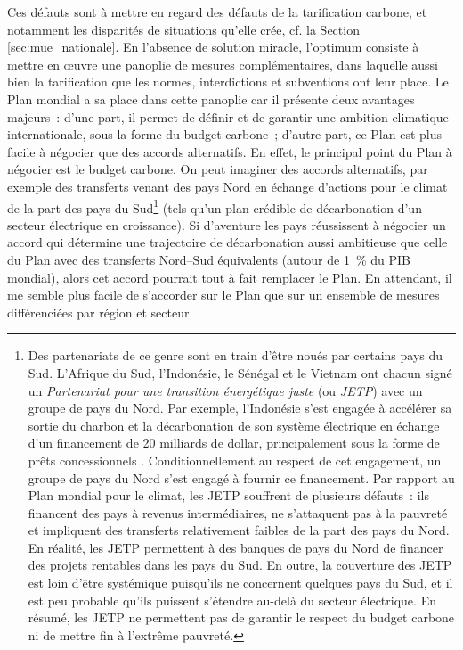 \documentclass[a5paper,french,openany]{memoir}
\begin{document}
Ces défauts sont à mettre en regard des défauts de la tarification carbone, et notamment les disparités de situations qu'elle crée, cf. la Section \ref{sec:mue_nationale}. En l'absence de solution miracle, l'optimum consiste à mettre en œuvre une panoplie de mesures complémentaires, dans laquelle aussi bien la tarification que les normes, interdictions et subventions ont leur place. Le Plan mondial a sa place dans cette panoplie car il présente deux avantages majeurs~: d'une part, il permet de définir et de garantir une ambition climatique internationale, sous la forme du budget carbone~; d'autre part, ce Plan est plus facile à négocier que des accords alternatifs. En effet, le principal point du Plan à négocier est le budget carbone. On peut imaginer des accords alternatifs, par exemple des transferts venant des pays Nord en échange d'actions pour le climat de la part des pays du Sud\footnote{Des partenariats de ce genre sont en train d'être noués par certains pays du Sud. L'Afrique du Sud, l'Indonésie, le Sénégal et le Vietnam ont chacun signé un \textit{Partenariat pour une transition énergétique juste} (ou \textit{JETP}) avec un groupe de pays du Nord. Par exemple, l'Indonésie s'est engagée à accélérer sa sortie du charbon et la décarbonation de son système électrique en échange d'un financement de 20 milliards de dollar, principalement sous la forme de prêts concessionnels \citep{ha-duong_just_2023}. Conditionnellement au respect de cet engagement, un groupe de pays du Nord s'est engagé à fournir ce financement. Par rapport au Plan mondial pour le climat, les JETP souffrent de plusieurs défauts~: ils financent des pays à revenus intermédiaires, ne s'attaquent pas à la pauvreté et impliquent des transferts relativement faibles de la part des pays du Nord. En réalité, les JETP permettent à des banques de pays du Nord de financer des projets rentables dans les pays du Sud. En outre, la couverture des JETP est loin d'être systémique puisqu'ils ne concernent quelques pays du Sud, et il est peu probable qu'ils puissent s'étendre au-delà du secteur électrique. En résumé, les JETP ne permettent pas de garantir le respect du budget carbone ni de mettre fin à l'extrême pauvreté.} 
(tels qu'un plan crédible de décarbonation d'un secteur électrique en croissance). Si d'aventure les pays réussissent à négocier un accord qui détermine une trajectoire de décarbonation aussi ambitieuse que celle du Plan avec des transferts Nord--Sud équivalents (autour de 1~\% du PIB mondial), alors cet accord pourrait tout à fait remplacer le Plan. En attendant, il me semble plus facile de s'accorder sur le Plan que sur un ensemble de mesures différenciées par région et secteur.
\end{document}
